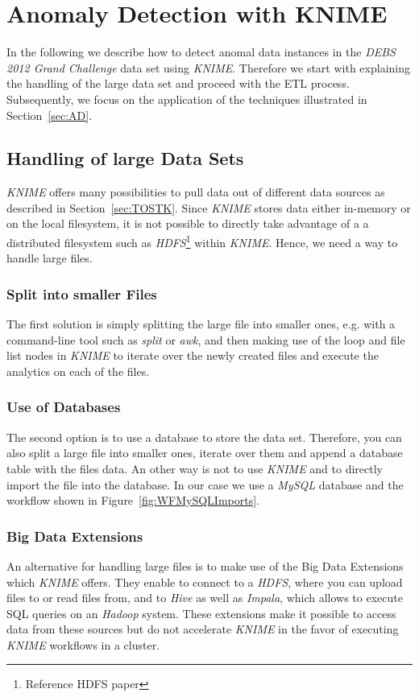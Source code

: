 \documentclass{dima}
\begin{document}
\section{Anomaly Detection with KNIME}
\label{sec:ADwK}

In the following we describe how to detect anomal data instances in the \textit{DEBS 2012 Grand Challenge} data set using \textit{KNIME}. Therefore we start with explaining the handling of the large data set and proceed with the ETL process. Subsequently, we focus on the application of the techniques illustrated in Section~\ref{sec:AD}.

\subsection{Handling of large Data Sets}
\textit{KNIME} offers many possibilities to pull data out of different data sources as described in Section~\ref{sec:TOSTK}. Since \textit{KNIME} stores data either in-memory or on the local filesystem, it is not possible to directly take advantage of a a distributed filesystem such as \textit{HDFS}\footnote{Reference HDFS paper} within \textit{KNIME}. Hence, we need a way to handle large files.

\subsubsection{Split into smaller Files}
The first solution is simply splitting the large file into smaller ones, e.g. with a command-line tool such as \textit{split} or \textit{awk}, and then making use of the loop and file list nodes in \textit{KNIME} to iterate over the newly created files and execute the analytics on each of the files.

\subsubsection{Use of Databases}
The second option is to use a database to store the data set. Therefore, you can also split a large file into smaller ones, iterate over them and append a database table with the files data. An other way is not to use \textit{KNIME} and to directly import the file into the database. In our case we use a \textit{MySQL} database and the workflow shown in Figure~\ref{fig:WFMySQLImports}.


\subsubsection{Big Data Extensions}
An alternative for handling large files is to make use of the Big Data Extensions which \textit{KNIME} offers. They enable to connect to a \textit{HDFS}, where you can upload files to or read files from, and to \textit{Hive} as well as \textit{Impala}, which allows to execute SQL queries on an \textit{Hadoop} system. These extensions make it possible to access data from these sources but do not accelerate \textit{KNIME} in the favor of executing \textit{KNIME} workflows in a cluster.
\end{document}
